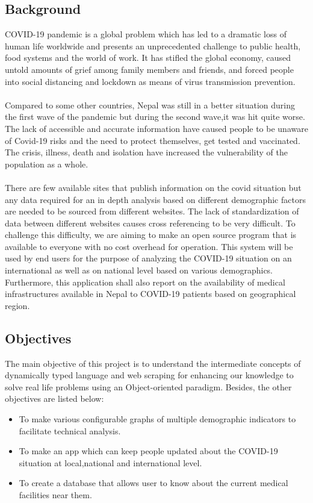 \documentclass[12pt]{article}
\begin{document}
\subsection{Background}
COVID-19 pandemic is a global problem which has led to a dramatic loss of human life worldwide and presents an unprecedented challenge to public health, food systems and the world of work. It has stifled the global economy, caused untold amounts of grief among family members and friends, and forced people into social 
distancing and lockdown as means of virus transmission prevention. 
\\\\
Compared to some other countries, Nepal was still in a better situation during the first wave of the pandemic but during the second wave,it was hit quite worse. The lack of accessible and accurate information have caused people to be unaware of Covid-19 risks and the need to protect themselves, get tested and vaccinated. The crisis, illness, death and isolation have increased the vulnerability of the population as a whole.
\\\\
There are few available sites that publish information on the covid situation but any data required for an in depth analysis based on different demographic factors 
are needed to be sourced from different websites. The lack of standardization of data between different websites causes cross referencing to be very difficult. To 
challenge this difficulty, we are aiming to make an open source program that is available to everyone with no cost overhead for operation. This system will be used 
by end users for the purpose of analyzing the COVID-19 situation on an international as well as on national level based on various demographics. Furthermore, this application shall also report on the availability of medical infrastructures available in Nepal to COVID-19 patients based on geographical region.

\vspace*{5mm}
\subsection{Objectives}
The main objective of this project is to understand the intermediate concepts of dynamically typed language and web scraping for enhancing our knowledge to solve 
real life problems using an Object-oriented paradigm. Besides, the other objectives are listed below:
\begin{itemize}
    \item To make various configurable graphs of multiple demographic indicators to facilitate technical analysis.
    \item To make an app which can keep people updated about the COVID-19 situation at local,national and international level. 
    \item To create a database that allows user to know about the current medical facilities near them.     
\end{itemize}
\end{document}
